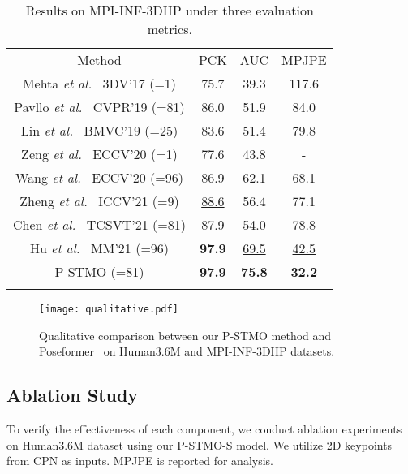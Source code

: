 \documentclass[]{llncs}
\begin{document}
\begin{table}[t]\scriptsize
\begin{center}
\caption{Results on MPI-INF-3DHP under three evaluation metrics.}
\vspace{-0.1cm}
\label{tab:3dhp}
\begin{tabular}{c|ccc}
\hline\noalign{\smallskip}
Method&PCK&AUC&MPJPE\\
\noalign{\smallskip}
\hline
\noalign{\smallskip}
Mehta \textit{et al.}~\cite{mehta2017monocular} 3DV'17 (=1)&75.7&39.3&117.6\\
Pavllo \textit{et al.}~\cite{pavllo20193d} CVPR'19 (=81)&86.0&51.9&84.0\\
Lin \textit{et al.}~\cite{lin2019trajectory} BMVC'19 (=25)&83.6&51.4&79.8\\
Zeng \textit{et al.}~\cite{zeng2020srnet} ECCV'20 (=1)&77.6&43.8&-\\
Wang \textit{et al.}~\cite{wang2020motion} ECCV'20 (=96)&86.9&62.1&68.1\\
Zheng \textit{et al.}~\cite{zheng20213d} ICCV'21 (=9)&\underline{88.6}&56.4&77.1\\
Chen \textit{et al.}~\cite{chen2021anatomy} TCSVT'21 (=81)&87.9&54.0&78.8\\
Hu \textit{et al.}~\cite{hu2021conditional} MM'21 (=96)&\textbf{97.9}&\underline{69.5}&\underline{42.5}\\
\noalign{\smallskip}
\hline
\noalign{\smallskip}
P-STMO (=81)&\textbf{97.9}&\textbf{75.8}&\textbf{32.2}\\
\noalign{\smallskip}
\hline
\end{tabular}
\end{center}
\vspace{-0.6cm}
\end{table}

\begin{figure}[t]
\centering
\texttt{[image: qualitative.pdf]}
\vspace{-0.7cm}
\caption{Qualitative comparison between our P-STMO method and Poseformer~\cite{zheng20213d} on Human3.6M and MPI-INF-3DHP datasets.}
\vspace{-0.5cm}
\label{fig:qualitative}
\end{figure}
\subsection{Ablation Study}
To verify the effectiveness of each component, we conduct ablation experiments on Human3.6M dataset using our P-STMO-S model. We utilize 2D keypoints from CPN as inputs. MPJPE is reported for analysis.
\end{document}
